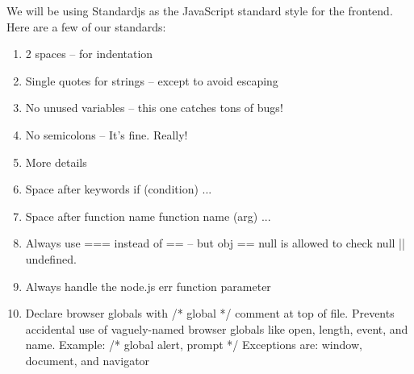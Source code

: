 \documentclass[11pt]{article}
\begin{document}
We will be using Standardjs as the JavaScript standard style for the frontend. Here are a few of our standards:
\begin{enumerate}
	\item 2 spaces – for indentation
	\item Single quotes for strings – except to avoid escaping
	\item No unused variables – this one catches tons of bugs!
	\item No semicolons – It's fine. Really!
	\item More details
	\item Space after keywords if (condition) { ... }
	\item Space after function name function name (arg) { ... }
	\item Always use === instead of == – but obj == null is allowed to check null || undefined.
	\item Always handle the node.js err function parameter
	\item Declare browser globals with /* global */ comment at top of file. Prevents accidental use of vaguely-named browser globals like open, length, event, and name. Example: /* global alert, prompt */ Exceptions are: window, document, and navigator
\end{enumerate}
\end{document}
